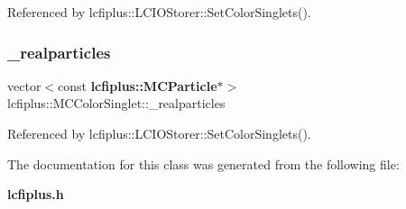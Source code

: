 Referenced by lcfiplus\+::\+L\+C\+I\+O\+Storer\+::\+Set\+Color\+Singlets().

\mbox{\label{classlcfiplus_1_1MCColorSinglet_ac1c26812e4cc9cc46006f3284a65b3ab}} 
\subsubsection{\+\_\+realparticles}
{\footnotesize\ttfamily vector$<$const \textbf{ lcfiplus\+::\+M\+C\+Particle}$\ast$$>$ lcfiplus\+::\+M\+C\+Color\+Singlet\+::\+\_\+realparticles}



Referenced by lcfiplus\+::\+L\+C\+I\+O\+Storer\+::\+Set\+Color\+Singlets().



The documentation for this class was generated from the following file\+:\begin{DoxyCompactItemize}
\item 
\textbf{ lcfiplus.\+h}\end{DoxyCompactItemize}
